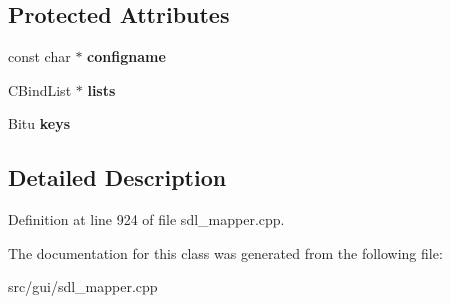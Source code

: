 \subsection*{Protected Attributes}
\begin{DoxyCompactItemize}
\item 
\hypertarget{classCKeyBindGroup_a7202ea1d9a5efdcda4f277d03e63ad63}{const char $\ast$ {\bfseries configname}}\label{classCKeyBindGroup_a7202ea1d9a5efdcda4f277d03e63ad63}

\item 
\hypertarget{classCKeyBindGroup_a915bc22f23540b1f8924adc831ba86ee}{C\-Bind\-List $\ast$ {\bfseries lists}}\label{classCKeyBindGroup_a915bc22f23540b1f8924adc831ba86ee}

\item 
\hypertarget{classCKeyBindGroup_a0d64ae014dfbdc463fea363dccd1bda6}{Bitu {\bfseries keys}}\label{classCKeyBindGroup_a0d64ae014dfbdc463fea363dccd1bda6}

\end{DoxyCompactItemize}


\subsection{Detailed Description}


Definition at line 924 of file sdl\-\_\-mapper.\-cpp.



The documentation for this class was generated from the following file\-:\begin{DoxyCompactItemize}
\item 
src/gui/sdl\-\_\-mapper.\-cpp\end{DoxyCompactItemize}
